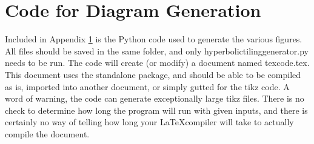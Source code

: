 \documentclass[12 pt,oneside]{book}
\begin{document}
\chapter{Code for Diagram Generation}
\label{ch:app}
Included in Appendix \ref{ch:app} is the Python code used to generate the various figures. All files should be saved in the same folder, and only hyperbolictilinggenerator.py needs to be run. The code will create (or modify) a document named texcode.tex. This document uses the standalone package, and should be able to be compiled as is, imported into another document, or simply gutted for the tikz code. A word of warning, the code can generate exceptionally large tikz files. There is no check to determine how long the program will run with given inputs, and there is certainly no way of telling how long your \LaTeX compiler will take to actually compile the document.\\








%

\end{document}
